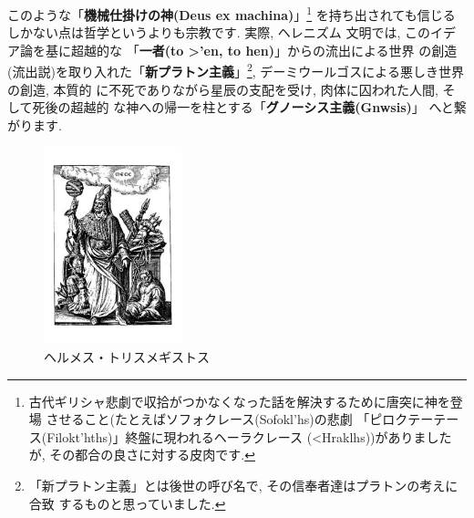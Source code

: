 このような「\textbf{機械仕掛けの神(Deus ex machina)}」\footnote{
古代ギリシャ悲劇で収拾がつかなくなった話を解決するために唐突に神を登場
させること(たとえばソフォクレース(\textgreek{Sofokl'hs})の悲劇
「ピロクテーテース(\textgreek{Filokt'hths})」終盤に現われるヘーラクレース
(\textgreek{<Hraklhs}))がありましたが, その都合の良さに対する皮肉です.}
を持ち出されても信じるしかない点は哲学というよりも宗教です. 実際, ヘレニズム
文明では, このイデア論を基に超越的な
「\textbf{一者(\textgreek{to >'en}, to hen)}」からの流出による世界
の創造(流出説)を取り入れた「\textbf{新プラトン主義}」\footnote{
「新プラトン主義」とは後世の呼び名で, その信奉者達はプラトンの考えに合致
するものと思っていました.}, デーミウールゴスによる悪しき世界の創造, 本質的
に不死でありながら星辰の支配を受け, 肉体に囚われた人間, そして死後の超越的
な神への帰一を柱とする「\textbf{グノーシス主義(\textgreek{Gnwsis})}」
へと繋がります.


\begin{figure}
\includegraphics[width=4cm]{HermesTrismegistusCauc.pdf}
\caption{ヘルメス・トリスメギストス}
\label{fig:trismegistus}
\end{figure}

